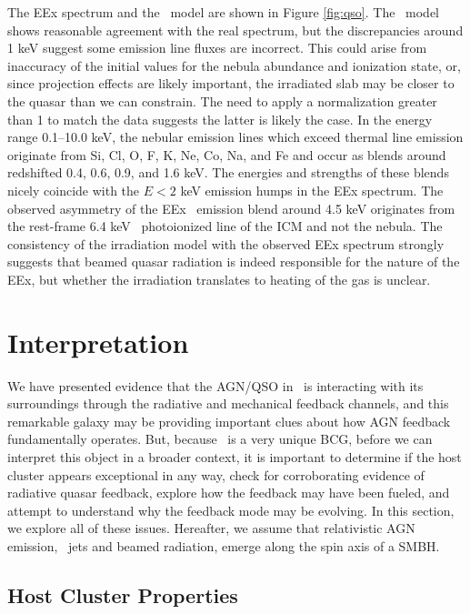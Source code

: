 \documentclass[useAMS,usenatbib]{mn2e}
\begin{document}
The EEx spectrum and the \cloudy\ model are shown in Figure
\ref{fig:qso}. The \cloudy\ model shows reasonable agreement with the
real spectrum, but the discrepancies around 1 keV suggest some
emission line fluxes are incorrect. This could arise from inaccuracy
of the initial values for the nebula abundance and ionization state,
or, since projection effects are likely important, the irradiated slab
may be closer to the quasar than we can constrain. The need to apply a
normalization greater than 1 to match the data suggests the latter is
likely the case. In the energy range 0.1--10.0 keV, the nebular
emission lines which exceed thermal line emission originate from Si,
Cl, O, F, K, Ne, Co, Na, and Fe and occur as blends around redshifted
0.4, 0.6, 0.9, and 1.6 keV. The energies and strengths of these blends
nicely coincide with the $E < 2$ keV emission humps in the EEx
spectrum. The observed asymmetry of the EEx \feka\ emission blend
around 4.5 keV originates from the rest-frame 6.4 keV
\feka\ photoionized line of the ICM and not the nebula. The
consistency of the irradiation model with the observed EEx spectrum
strongly suggests that beamed quasar radiation is indeed responsible
for the nature of the EEx, but whether the irradiation translates to
heating of the gas is unclear.

\section{Interpretation}
\label{sec:interp}

We have presented evidence that the AGN/QSO in \irs\ is interacting
with its surroundings through the radiative and mechanical feedback
channels, and this remarkable galaxy may be providing important clues
about how AGN feedback fundamentally operates. But, because \irs\ is a
very unique BCG, before we can interpret this object in a broader
context, it is important to determine if the host cluster appears
exceptional in any way, check for corroborating evidence of radiative
quasar feedback, explore how the feedback may have been fueled, and
attempt to understand why the feedback mode may be evolving. In this
section, we explore all of these issues. Hereafter, we assume that
relativistic AGN emission, \eg\ jets and beamed radiation, emerge
along the spin axis of a SMBH.

\subsection{Host Cluster Properties}
\end{document}
